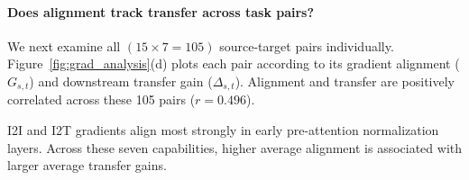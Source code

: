 \paragraph{Does alignment track transfer across task pairs?}
We next examine all $(15\times7=105)$ source-target pairs individually.
Figure~\ref{fig:grad_analysis}(d) plots each pair according to its gradient alignment ($G_{s,t}$) and downstream transfer gain ($\Delta_{s,t}$).
Alignment and transfer are positively correlated across these 105 pairs ($r=0.496$).


\begin{findingbox}
I2I and I2T gradients align most strongly in early pre-attention normalization layers.
Across these seven capabilities, higher average alignment is associated with larger average transfer gains.
\end{findingbox}








